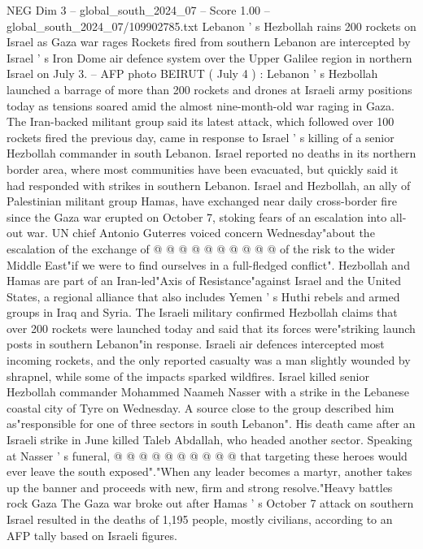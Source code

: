 \begin{textsample}{NEG Dim 3 – global\_south\_2024\_07 – Score 1.00 – global\_south\_2024\_07/109902785.txt}  \label{ex:f3_neg_148}
Lebanon ' s Hezbollah rains 200 rockets on Israel as Gaza war rages Rockets fired from southern Lebanon are intercepted by Israel ' s Iron Dome air defence system over the Upper Galilee region in northern Israel on July 3. -- AFP photo BEIRUT ( July 4 ) : Lebanon ' s Hezbollah launched a barrage of more than 200 rockets and drones at Israeli army positions today as tensions soared amid the almost nine-month-old war raging in Gaza.
The Iran-backed militant group said its latest attack, which followed over 100 rockets fired the previous day, came in response to Israel ' s killing of a senior Hezbollah commander in south Lebanon.
Israel reported no deaths in its northern border area, where most communities have been evacuated, but quickly said it had responded with strikes in southern Lebanon.
Israel and Hezbollah, an ally of Palestinian militant group Hamas, have exchanged near daily cross-border fire since the Gaza war erupted on October 7, stoking fears of an escalation into all-out war.
UN chief Antonio Guterres voiced concern Wednesday"about the escalation of the exchange of @ @ @ @ @ @ @ @ @ @ of the risk to the wider Middle East"if we were to find ourselves in a full-fledged conflict".
Hezbollah and Hamas are part of an Iran-led"Axis of Resistance"against Israel and the United States, a regional alliance that also includes Yemen ' s Huthi rebels and armed groups in Iraq and Syria.
The Israeli military confirmed Hezbollah claims that over 200 rockets were launched today and said that its forces were"striking launch posts in southern Lebanon"in response.
Israeli air defences intercepted most incoming rockets, and the only reported casualty was a man slightly wounded by shrapnel, while some of the impacts sparked wildfires.
Israel killed senior Hezbollah commander Mohammed Naameh Nasser with a strike in the Lebanese coastal city of Tyre on Wednesday.
A source close to the group described him as"responsible for one of three sectors in south Lebanon".
His death came after an Israeli strike in June killed Taleb Abdallah, who headed another sector.
Speaking at Nasser ' s funeral, @ @ @ @ @ @ @ @ @ @ that targeting these heroes would ever leave the south exposed"."When any leader becomes a martyr, another takes up the banner and proceeds with new, firm and strong resolve."Heavy battles rock Gaza The Gaza war broke out after Hamas ' s October 7 attack on southern Israel resulted in the deaths of 1,195 people, mostly civilians, according to an AFP tally based on Israeli figures.

\end{textsample}
